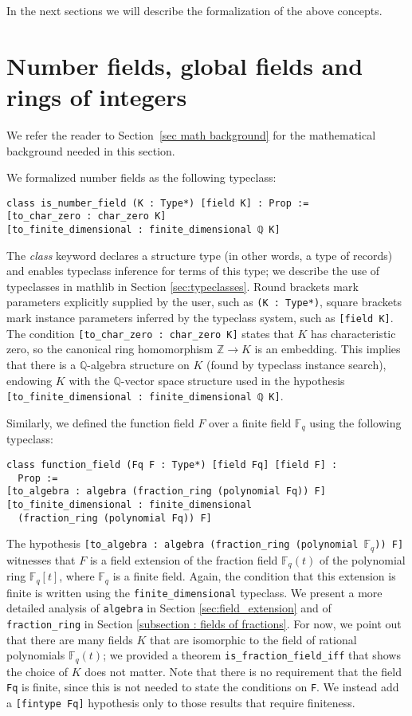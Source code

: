 \documentclass[sn-mathphys]{sn-jnl}%
\newcommand{\lean}[1]{\texttt{#1}\xspace}
\newcommand*{\Fq}[1][q]{\mathbb{F}_{#1}}
\newcommand{\mathlib}{\textsf{mathlib}\xspace}
\newcommand{\QQ}{\mathbb{Q}}
\renewcommand{\Z}{\mathbb{Z}}
\begin{document}
In the next sections we will describe the formalization of the above concepts.

\section{Number fields, global fields and rings of integers} \label{sec:number fields}

We refer the reader to Section~\ref{sec math background} for the mathematical background needed in this section.

We formalized number fields as the following typeclass:
\begin{lstlisting}
class is_number_field (K : Type*) [field K] : Prop :=
[to_char_zero : char_zero K]
[to_finite_dimensional : finite_dimensional ℚ K]
\end{lstlisting}
The \emph{class} keyword declares a structure type (in other words, a type of records) and enables typeclass inference for terms of this type;
we describe the use of typeclasses in \mathlib in Section \ref{sec:typeclasses}.
Round brackets mark parameters explicitly supplied by the user, such as \lean{(K : Type*)},
square brackets mark instance parameters inferred by the typeclass system, such as \mbox{\lean{[field K]}}.
The condition \lean{[to\_char\_zero : char\_zero K]} states that $K$ has characteristic zero, so the canonical ring homomorphism $\Z \to K$ is an embedding.
This implies that there is a $\QQ$-algebra structure on $K$ (found by typeclass instance search), endowing $K$ with the $\QQ$-vector space structure used in the hypothesis \mbox{\lean{[to\_finite\_dimensional : finite\_dimensional ℚ K]}}.

Similarly, we defined the function field $F$ over a finite field $\Fq$ using the following typeclass:
\begin{lstlisting}
class function_field (Fq F : Type*) [field Fq] [field F] :
  Prop :=
[to_algebra : algebra (fraction_ring (polynomial Fq)) F]
[to_finite_dimensional : finite_dimensional
  (fraction_ring (polynomial Fq)) F]
\end{lstlisting}
The hypothesis \lean{[to\_algebra : algebra (fraction\_ring (polynomial $\Fq$)) F]} witnesses that $F$ is a field extension of the fraction field $\Fq[q](t)$ of the polynomial ring $\Fq[q][t]$, where $\Fq[q]$ is a finite field.
Again, the condition that this extension is finite is written using the \lean{finite\_dimensional} typeclass.
We present a more detailed analysis of \lean{algebra} in Section \ref{sec:field_extension} and of \lean{fraction\_ring} in Section \ref{subsection : fields of fractions}.
For now, we point out that there are many fields $K$ that are isomorphic to the field of rational polynomials $\Fq[q](t)$; we provided a theorem \lean{is\_fraction\_field\_iff} that shows the choice of $K$ does not matter.
Note that there is no requirement that the field \lean{Fq} is finite, since this is not needed to state the conditions on \lean{F}.
We instead add a \lean{[fintype Fq]} hypothesis only to those results that require finiteness.
\end{document}
